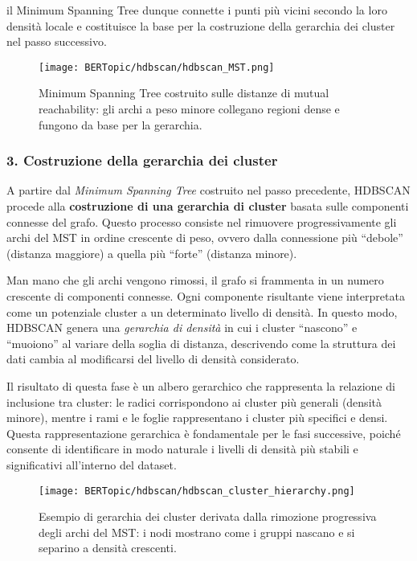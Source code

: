 il Minimum Spanning Tree dunque connette i punti più vicini secondo la loro densità locale e costituisce la base per la costruzione della gerarchia dei cluster nel passo successivo.

\begin{figure}[H]
\centering
\texttt{[image: BERTopic/hdbscan/hdbscan\_MST.png]}
\caption{Minimum Spanning Tree costruito sulle distanze di mutual reachability: gli archi a peso minore collegano regioni dense e fungono da base per la gerarchia.}
\label{fig:hdbscan-mst}
\end{figure}

\subsubsection*{3. Costruzione della gerarchia dei cluster}

A partire dal \textit{Minimum Spanning Tree} costruito nel passo precedente, HDBSCAN procede alla \textbf{costruzione di una gerarchia di cluster} basata sulle componenti connesse del grafo. 
Questo processo consiste nel rimuovere progressivamente gli archi del MST in ordine crescente di peso, ovvero dalla connessione più ``debole'' (distanza maggiore) a quella più ``forte'' (distanza minore).

Man mano che gli archi vengono rimossi, il grafo si frammenta in un numero crescente di componenti connesse. 
Ogni componente risultante viene interpretata come un potenziale cluster a un determinato livello di densità. 
In questo modo, HDBSCAN genera una \textit{gerarchia di densità} in cui i cluster ``nascono'' e ``muoiono'' al variare della soglia di distanza, descrivendo come la struttura dei dati cambia al modificarsi del livello di densità considerato.

Il risultato di questa fase è un albero gerarchico che rappresenta la relazione di inclusione tra cluster: 
le radici corrispondono ai cluster più generali (densità minore), mentre i rami e le foglie rappresentano i cluster più specifici e densi. 
Questa rappresentazione gerarchica è fondamentale per le fasi successive, poiché consente di identificare in modo naturale i livelli di densità più stabili e significativi all'interno del dataset.

\begin{figure}[H]
\centering
\texttt{[image: BERTopic/hdbscan/hdbscan\_cluster\_hierarchy.png]}
\caption{Esempio di gerarchia dei cluster derivata dalla rimozione progressiva degli archi del MST: i nodi mostrano come i gruppi nascano e si separino a densità crescenti.}
\label{fig:hdbscan-cluster-hierarchy}
\end{figure}

